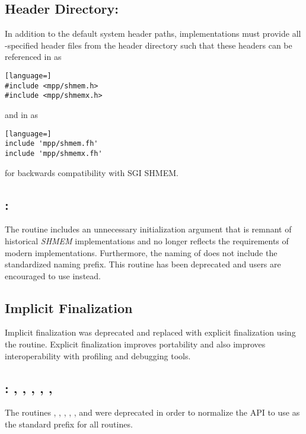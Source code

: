 \subsection{Header Directory: }
\label{dep:mpp_header}
In addition to the default system header paths, \openshmem implementations
must provide all \openshmem-specified header files from the 
header directory such that these headers can be referenced in \CorCpp as
\begin{lstlisting}[language=]
#include <mpp/shmem.h>
#include <mpp/shmemx.h>
\end{lstlisting}
and in \Fortran as
\begin{lstlisting}[language=]
include 'mpp/shmem.fh'
include 'mpp/shmemx.fh'
\end{lstlisting}
for backwards compatibility with \ac{SGI} SHMEM.

\subsection{\CorCpp: }
The \CorCpp routine  includes an unnecessary initialization
argument that is remnant of historical \emph{SHMEM} implementations and no
longer reflects the requirements of modern \openshmem implementations.
Furthermore, the naming of  does not include the standardized
\shmemprefixLC{} naming prefix. This routine has been deprecated and
\openshmem users are encouraged to use  instead.

\subsection{Implicit Finalization}
Implicit finalization was deprecated and replaced with explicit finalization using the
 routine.  Explicit finalization improves portability and
also improves interoperability with profiling and debugging tools.

\subsection{\CorCpp: , , ,
    , , }
The \CorCpp routines , , ,
, , and  were deprecated in order
to normalize the \openshmem \ac{API} to use \shmemprefixLC{} as the standard
prefix for all routines.

